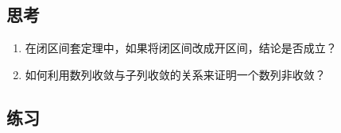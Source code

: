 \documentclass[a4paper,punct=CCT]{ctexbook}
\theoremstyle{definition}
\theoremstyle{remark}
\newif\ifshowex
\newif\ifshowsolp
\begin{document}
\subsection*{思考}

\begin{enumerate}
\item 在闭区间套定理中，如果将闭区间改成开区间，结论是否成立？

  \ifshowsolp
  不成立，最终可能是一个空集．设\(a_n = 0,\ b_n = 1/n\)，显然有\(\paren{a_{n+1}, b_{n+1}} \subset \paren{a_n, b_n}\)且\(\lim_{n\to\infty} \paren{b_n - a_n} = 0\)．但是,
  \begin{equation*}
    \bigcap_{n=1}^\infty \paren{a_n, b_n} = \bigcap_{n=1}^\infty \paren[\Big]{0, \frac1n} = \emptyset.
  \end{equation*}
  \fi

\item 如何利用数列收敛与子列收敛的关系来证明一个数列非收敛？

  \ifshowsolp
  只要找到该数列的一个不收敛子列即可．
  \fi
\end{enumerate}

\ifshowex
{}
\subsection*{练习}
\end{document}
